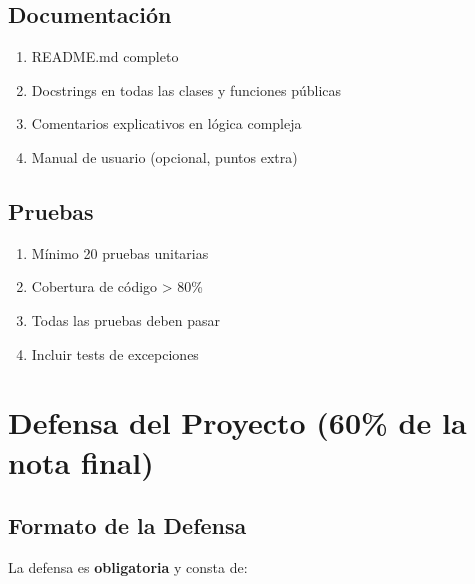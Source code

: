 \documentclass[12pt,a4paper]{article}
\begin{document}
\subsection{Documentación}
\begin{enumerate}[leftmargin=*]
    \item README.md completo
    \item Docstrings en todas las clases y funciones públicas
    \item Comentarios explicativos en lógica compleja
    \item Manual de usuario (opcional, puntos extra)
\end{enumerate}

\subsection{Pruebas}
\begin{enumerate}[leftmargin=*]
    \item Mínimo 20 pruebas unitarias
    \item Cobertura de código > 80\%
    \item Todas las pruebas deben pasar
    \item Incluir tests de excepciones
\end{enumerate}

\section{Defensa del Proyecto (60\% de la nota final)}

\subsection{Formato de la Defensa}

La defensa es \textbf{obligatoria} y consta de:
\end{document}

